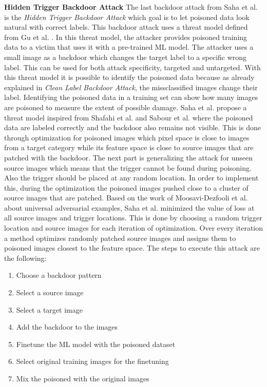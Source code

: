 \textbf{Hidden Trigger Backdoor Attack} The last backdoor attack from Saha et al. \cite{DBLP:journals/corr/abs-1910-00033} is the \textit{Hidden Trigger Backdoor Attack} which goal is to let poisoned data look natural with correct labels. This backdoor attack uses a threat model defined from Gu et al. \cite{DBLP:journals/corr/abs-1708-06733}. In this threat model, the attacker provides poisoned training data to a victim that uses it with a pre-trained ML model. The attacker uses a small image as a backdoor which changes the target label to a specific wrong label. This can be used for both attack specificity, targeted and untargeted. With this threat model it is possible to identify the poisoned data because as already explained in \textit{Clean Label Backdoor Attack}, the missclassified images change their label. Identifying the poisoned data in a training set can show how many images are poisoned to measure the extent of possible damage. Saha et al. propose a threat model inspired
from Shafahi et al. \cite{DBLP:journals/corr/abs-1804-00792} and Sabour et al. \cite{DBLP:journals/corr/SabourCFF15} where the poisoned data are labeled correctly and the backdoor also remains not visible. This is done through optimization for poisoned images which pixel space is close to images from a target category while its feature space is close to source images that are patched with the backdoor. The next part is generalizing the attack for unseen source images which means that the trigger cannot be found during poisoning. Also the trigger should be placed at any random location. In order to implement this, during the optimization the poisoned images pushed close to a cluster of source images that are patched. Based on the
work of Moosavi-Dezfooli et al. \cite{DBLP:conf/cvpr/Moosavi-Dezfooli17} about universal adversarial examples, Saha et al. minimized the value of loss at all source images and trigger locations. This is done by choosing a random trigger location and source images for each iteration of optimization. Over every iteration a method optimizes randomly patched source images and assigns them to poisoned images closest to the feature space. The steps to execute this attack are the following:

\begin{enumerate}
  \item Choose a backdoor pattern
  \item Select a source image
  \item Select a target image
  \item Add the backdoor to the images
  \item Finetune the ML model with the poisoned dataset
  \item Select original training images for the finetuning
  \item Mix the poisoned with the original images
\end{enumerate}


